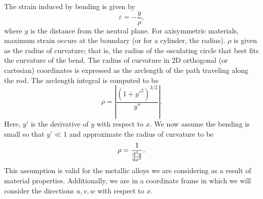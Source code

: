 The strain induced by bending is given by
\begin{equation}
\varepsilon = -\frac{y}{\rho},
\label{eq:strain.bend.basic}
\end{equation}
where $y$ is the distance from the neutral plane. For axisymmetric materials, maximum strain occurs at the boundary (or for a cylinder, the radius). $\rho$ is given as the radius of curvature; that is, the radius of the osculating circle that best fits the curvature of the bend. The radius of curvature in 2D orthogonal (or cartesian) coordinates is expressed as the arclength of the path traveling along the rod.  The arclength integral is computed to be 
\begin{equation}
\rho = \left|\frac{(1+{y'}^2)^{3/2}}{y''}\right|.
\end{equation}
Here, $y'$ is the derivative of $y$ with respect to $x$. We now assume the bending is small so that $y'\ll1$ and approximate the radius of curvature to be
\begin{equation}
\rho = \frac{1}{\frac{\text d^2y}{\text dx^2}}.
\label{eq:radius.curvature}
\end{equation}
This assumption is valid for the metallic alloys we are considering as a result of material properties. Additionally, we are in a coordinate frame in which we will consider the directions $u,v,w$ with respect to $x$.


